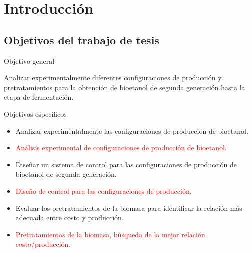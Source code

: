 \documentclass[12pt]{article}
\begin{document}
	
	\pagestyle{empty}
	
	
	\tableofcontents
	\date{}
     \newpage
	\listoftables
	\clearpage
	\newpage
	
	
	\pagestyle{plain}
	\setcounter{page}{1} 
		\section{Introducción}
	
		
		
		
	\subsection{Objetivos del trabajo de tesis}
	{\large Objetivo general}
	
	Analizar experimentalmente diferentes configuraciones de producción y pretratamientos para la obtención de bioetanol de segunda generación  hasta la etapa de fermentación. \newline \newline
	
	{\large Objetivos específicos}
	
	\begin{itemize}
		\item 
		Analizar experimentalmente las configuraciones de producción de bioetanol.
		\item \textcolor{red}{Análisis experimental de configuraciones de producción de bioetanol.}
		\item 
		Diseñar un sistema de control para las configuraciones de producción de bioetanol de segunda generación.
			
		\item \textcolor{red}{Diseño de control para las configuraciones de producción.}
		
		\item 
       Evaluar los pretratamientos de la biomasa para identificar la relación más adecuada entre costo y producción.
      \item \textcolor{red}{Pretratamientos de la biomasa, búsqueda de la mejor relación costo/producción.}
	\end{itemize}
	
\end{document}
